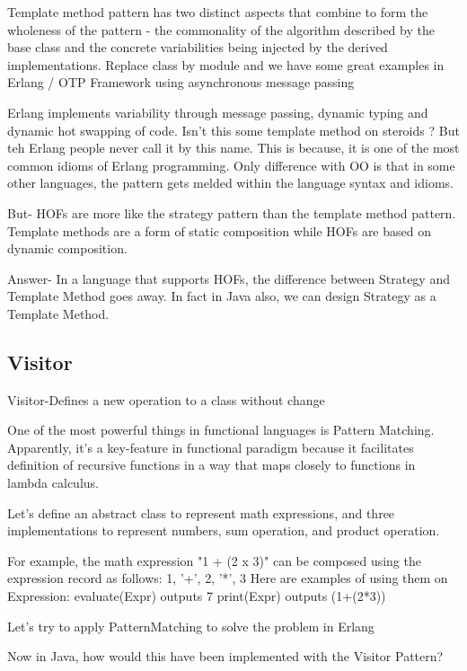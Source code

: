     Template method pattern has two distinct aspects that combine to form the wholeness of the pattern - the commonality of the algorithm described by the base class and the concrete variabilities being injected by the derived implementations. Replace class by module and we have some great examples in Erlang / OTP Framework using asynchronous message passing

    Erlang implements variability through message passing, dynamic typing and dynamic hot swapping of code. Isn't this some template method on steroids ? But teh Erlang people never call it by this name. This is because, it is one of the most common idioms of Erlang programming. Only difference with OO is that in some other languages, the pattern gets melded within the language syntax and idioms.


    But-
    HOFs are more like the strategy pattern than the template method pattern. Template methods are a form of static composition while HOFs are based on dynamic composition.

    Answer-
    In a language that supports HOFs, the difference between Strategy and Template Method goes away. In fact in Java also, we can design Strategy as a Template Method.

\subsection{Visitor} \label{subsection:pattern26}
    Visitor-Defines a new operation to a class without change


    One of the most powerful things in functional languages is Pattern Matching. Apparently, it's a key-feature in functional paradigm because it facilitates definition of recursive functions in a way that maps closely to functions in lambda calculus.~\cite{res3}

    Let's define an abstract class to represent math expressions, and three implementations to represent numbers, sum operation, and product operation.

    For example, the math expression "1 + (2 x 3)" can be composed using the expression record as follows:
    {1, '+', {2, '*', 3}}
    Here are examples of using them on Expression:
    evaluate(Expr) outputs 7
    print(Expr) outputs (1+(2*3))

    Let's try to apply PatternMatching to solve the problem in Erlang

    Now in Java, how would this have been implemented with the Visitor Pattern?

